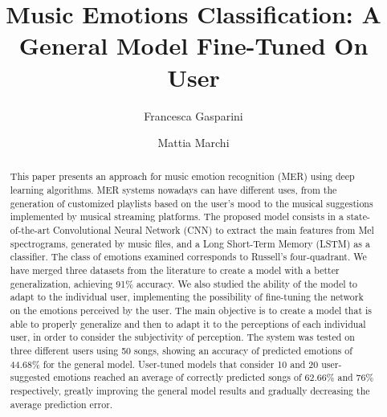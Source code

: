 \documentclass[runningheads]{llncs}
\begin{document}
\title{Music Emotions Classification: A General Model Fine-Tuned On User}



\author{Francesca Gasparini \and
Mattia Marchi}



\maketitle

\begin{abstract}
This paper presents an approach for music emotion recognition (MER) using deep learning algorithms. MER systems nowadays can have different uses, from the generation of customized playlists based on the user's mood to the musical suggestions implemented by musical streaming platforms. The proposed model consists in a state-of-the-art Convolutional Neural Network (CNN) to extract the main features from Mel spectrograms, generated by music files, and a Long Short-Term Memory (LSTM) as a classifier. The class of emotions examined corresponds to Russell's four-quadrant. We have merged three datasets from the literature to create a model with a better generalization, achieving 91\% accuracy. We also studied the ability of the model to adapt to the individual user, implementing the possibility of fine-tuning the network on the emotions perceived by the user. The main objective is to create a model that is able to properly generalize and then to adapt it to the perceptions of each individual user, in order to consider the subjectivity of perception. The system was tested on three different users using 50 songs, showing an accuracy of predicted emotions of 44.68\% for the general model. User-tuned models that consider 10 and 20 user-suggested emotions reached an average of correctly predicted songs of 62.66\% and 76\% respectively, greatly improving the general model results and gradually decreasing the average prediction error.

\end{abstract}
\end{document}
